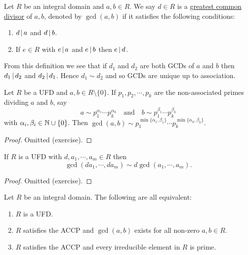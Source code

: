 \documentclass[11pt]{article}
\begin{document}
\begin{definition}
    Let $R$ be an integral domain and $a,b\in R$. We say $d\in R$ is a \ul{greatest common divisor} of $a,b$, denoted by $\gcd(a,b)$ if it satisfies the following conditions:
    \begin{enumerate}
        \item $d\,|\, a$ and $d\,|\, b$.
        \item If $e\in R$ with $e\,|\, a$ and $e\,|\, b$ then $e\,|\, d$.
    \end{enumerate}
\end{definition}

\begin{note}
    From this definition we see that if $d_1$ and $d_2$ are both GCDs of $a$ and $b$ then $d_1\,|\, d_2$ and $d_2\,|\, d_1$. Hence $d_1\sim d_2$ and so GCDs are unique up to association.
\end{note}

\begin{proposition}
    Let $R$ be a UFD and $a,b\in R\setminus\{0\}$. If $p_1,p_2,\cdots,p_k$ are the non-associated primes dividing $a$ and $b$, say
    \[a\sim p_1^{\alpha_1}\cdots p_k^{\alpha_k}\quad\text{and}\quad b\sim p_1^{\beta_1}\cdots p_k^{\beta_k}\]
    with $\alpha_i,\beta_i\in\mathbb{N}\cup\{0\}$. Then $\gcd(a,b)\sim p_1^{\min\{\alpha_1,\beta_1\}}\cdots p_k^{\min\{\alpha_k,\beta_k\}}$.
\end{proposition}

\begin{proof}
    Omitted (exercise).
    
\end{proof}

\begin{corollary}
    If $R$ is a UFD with $d,a_1,\cdots,a_m\in R$ then $$\gcd(da_1,\cdots,da_m)\sim d\gcd(a_1,\cdots,a_m).$$
\end{corollary}

\begin{proof}
    Omitted (exercise).
    
\end{proof}

\begin{theorem}
    Let $R$ be an integral domain. The following are all equivalent:
    \begin{enumerate}
        \item $R$ is a UFD.
        \item $R$ satisfies the ACCP and $\gcd(a,b)$ exists for all non-zero $a,b\in R$.
        \item $R$ satisfies the ACCP and every irreducible element in $R$ is prime.
    \end{enumerate}
\end{theorem}
\end{document}
